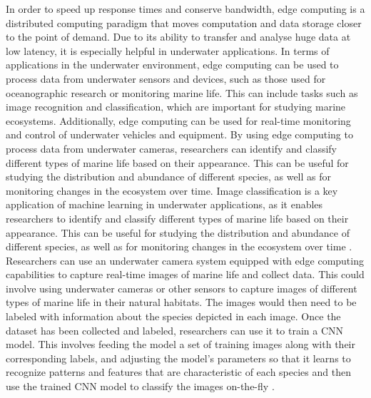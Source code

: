In order to speed up response times and conserve bandwidth, edge computing is a distributed computing paradigm that moves computation and data storage closer to the point of demand. Due to its ability to transfer and analyse huge data at low latency, it is especially helpful in underwater applications. In terms of applications in the underwater environment, edge computing can be used to process data from underwater sensors and devices, such as those used for oceanographic research or monitoring marine life. This can include tasks such as image recognition and classification, which are important for studying marine ecosystems. Additionally, edge computing can be used for real-time monitoring and control of underwater vehicles and equipment. By using edge computing to process data from underwater cameras, researchers can identify and classify different types of marine life based on their appearance. This can be useful for studying the distribution and abundance of different species, as well as for monitoring changes in the ecosystem over time. Image classification is a key application of machine learning in underwater applications, as it enables researchers to identify and classify different types of marine life based on their appearance. This can be useful for studying the distribution and abundance of different species, as well as for monitoring changes in the ecosystem over time
 \cite{periola2022edge}.
 Researchers can use an underwater camera system equipped with edge computing capabilities to capture real-time images of marine life and collect data. This could involve using underwater cameras or other sensors to capture images of different types of marine life in their natural habitats. The images would then need to be labeled with information about the species depicted in each image. Once the dataset has been collected and labeled, researchers can use it to train a CNN model. This involves feeding the model a set of training images along with their corresponding labels, and adjusting the model's parameters so that it learns to recognize patterns and features that are characteristic of each species and then use the trained CNN model to classify the images on-the-fly  \cite{periola2022edge}.


